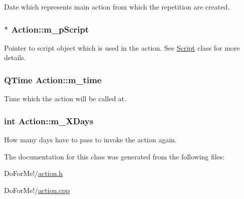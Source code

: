 Date which represents main action from which the repetition are created. 

\hypertarget{class_action_a1a57520ab430ca6241add1e68303fb0c}{
\subsubsection[{m\-\_\-p\-Script}]{$\ast$ Action\-::m\-\_\-p\-Script\hspace{0.3cm}{\ttfamily [private]}}}\label{class_action_a1a57520ab430ca6241add1e68303fb0c}


Pointer to script object which is used in the action. See \hyperlink{class_script}{Script} class for more details. 

\hypertarget{class_action_a00911e1be6fd7fa990a2a607590edaa9}{
\subsubsection[{m\-\_\-time}]{\setlength{\rightskip}{0pt plus 5cm}Q\-Time Action\-::m\-\_\-time\hspace{0.3cm}{\ttfamily [private]}}}\label{class_action_a00911e1be6fd7fa990a2a607590edaa9}


Time which the action will be called at. 

\hypertarget{class_action_a9ad7c62918ef062c3f593fd3fa7fd308}{
\subsubsection[{m\-\_\-\-X\-Days}]{\setlength{\rightskip}{0pt plus 5cm}int Action\-::m\-\_\-\-X\-Days\hspace{0.3cm}{\ttfamily [private]}}}\label{class_action_a9ad7c62918ef062c3f593fd3fa7fd308}


How many days have to pass to invoke the action again. 



The documentation for this class was generated from the following files\-:\begin{DoxyCompactItemize}
\item 
Do\-For\-Me!/\hyperlink{action_8h}{action.\-h}\item 
Do\-For\-Me!/\hyperlink{action_8cpp}{action.\-cpp}\end{DoxyCompactItemize}
